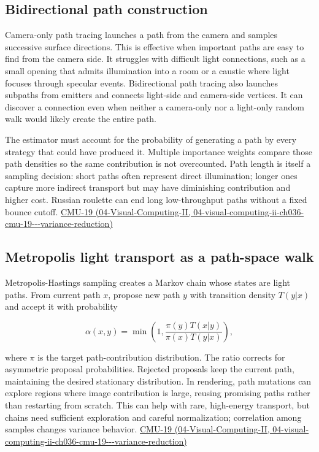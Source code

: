 \subsection{Bidirectional path construction}\label{03-visual-computing-i-ch011-bidirectional-path-construction}

Camera-only path tracing launches a path from the camera and samples successive surface directions. This is effective when important paths are easy to find from the camera side. It struggles with difficult light connections, such as a small opening that admits illumination into a room or a caustic where light focuses through specular events. Bidirectional path tracing also launches subpaths from emitters and connects light-side and camera-side vertices. It can discover a connection even when neither a camera-only nor a light-only random walk would likely create the entire path.

The estimator must account for the probability of generating a path by every strategy that could have produced it. Multiple importance weights compare those path densities so the same contribution is not overcounted. Path length is itself a sampling decision: short paths often represent direct illumination; longer ones capture more indirect transport but may have diminishing contribution and higher cost. Russian roulette can end long low-throughput paths without a fixed bounce cutoff. \href{../04-Visual-Computing-II/main.pdf\#nameddest=04-visual-computing-ii-ch036-cmu-19---variance-reduction}{CMU-19 (04-Visual-Computing-II, 04-visual-computing-ii-ch036-cmu-19-\/-\/-variance-reduction)}

\subsection{Metropolis light transport as a path-space walk}\label{03-visual-computing-i-ch011-metropolis-light-transport-as-a-path-space-walk}

Metropolis-Hastings sampling creates a Markov chain whose states are light paths. From current path \(x\), propose new path \(y\) with transition density \(T(y|x)\) and accept it with probability

\[
\alpha(x,y)=\min\left(1,\frac{\pi(y)T(x|y)}{\pi(x)T(y|x)}\right),
\]

where \(\pi\) is the target path-contribution distribution. The ratio corrects for asymmetric proposal probabilities. Rejected proposals keep the current path, maintaining the desired stationary distribution. In rendering, path mutations can explore regions where image contribution is large, reusing promising paths rather than restarting from scratch. This can help with rare, high-energy transport, but chains need sufficient exploration and careful normalization; correlation among samples changes variance behavior. \href{../04-Visual-Computing-II/main.pdf\#nameddest=04-visual-computing-ii-ch036-cmu-19---variance-reduction}{CMU-19 (04-Visual-Computing-II, 04-visual-computing-ii-ch036-cmu-19-\/-\/-variance-reduction)}

